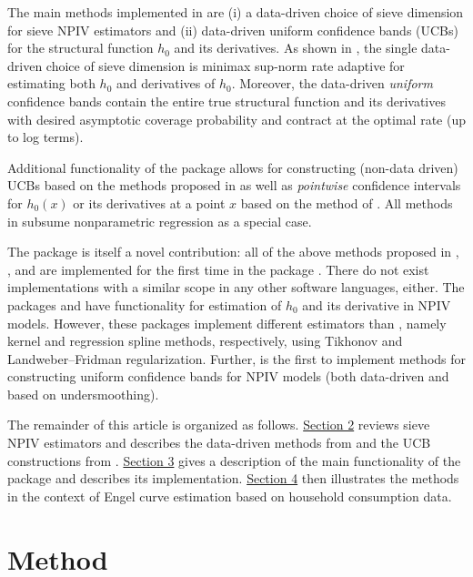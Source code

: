 \documentclass[
]{jss}
\begin{document}
The main methods implemented in  are (i) a data-driven choice
of sieve dimension for sieve NPIV estimators and (ii) data-driven
uniform confidence bands (UCBs) for the structural function \(h_0\) and
its derivatives. As shown in \citet{CCK}, the single data-driven choice
of sieve dimension is minimax sup-norm rate adaptive for estimating both
\(h_0\) and derivatives of \(h_0\). Moreover, the data-driven
\emph{uniform} confidence bands contain the entire true structural
function and its derivatives with desired asymptotic coverage
probability and contract at the optimal rate (up to log terms).

Additional functionality of the  package allows for
constructing (non-data driven) UCBs based on the methods proposed in
\citet{CCQE} as well as \emph{pointwise} confidence intervals for
\(h_0(x)\) or its derivatives at a point \(x\) based on the method of
\citet{ChenPouzo}. All methods in  subsume nonparametric
regression as a special case.

The package is itself a novel contribution: all of the above methods
proposed in \citet{CCK}, \citet{CCQE}, and \citet{ChenPouzo} are
implemented for the first time in the  package .
There do not exist implementations with a similar scope in any other
software languages, either. The  packages 
\citep{NPPkg} and  \citep{CRS} have functionality for
estimation of \(h_0\) and its derivative in NPIV models. However, these
packages implement different estimators than , namely kernel
and regression spline methods, respectively, using Tikhonov and
Landweber--Fridman regularization. Further,  is the first to
implement methods for constructing uniform confidence bands for NPIV
models (both data-driven and based on undersmoothing).

The remainder of this article is organized as follows.
\hyperref[method]{Section 2} reviews sieve NPIV estimators and describes
the data-driven methods from \citet{CCK} and the UCB constructions from
\citet{CCQE}. \hyperref[desc]{Section 3} gives a description of the main
functionality of the package  and describes its
implementation. \hyperref[engel]{Section 4} then illustrates the methods
in the context of Engel curve estimation based on household consumption
data.

\section{Method}\label{method}
\end{document}
